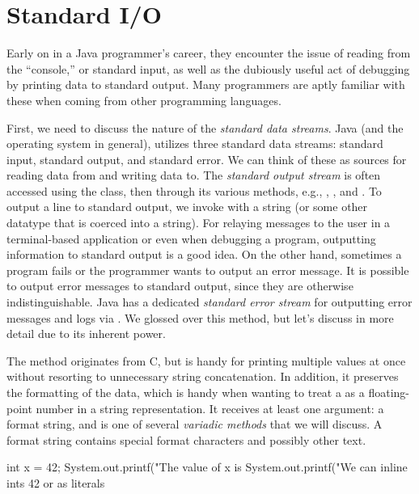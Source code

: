 \section{Standard I/O}
Early on in a Java programmer's career, they encounter the issue of reading from the ``console,'' or standard input, as well as the dubiously useful act of debugging by printing data to standard output. Many programmers are aptly familiar with these when coming from other programming languages.

First, we need to discuss the nature of the \textit{standard data streams}. Java (and the operating system in general), utilizes three standard data streams: standard input, standard output, and standard error. We can think of these as sources for reading data from and writing data to. The \textit{standard output stream} is often accessed using the  class, then through its various methods, e.g., , , and . To output a line to standard output, we invoke  with a string (or some other datatype that is coerced into a string). For relaying messages to the user in a terminal-based application or even when debugging a program, outputting information to standard output is a good idea. On the other hand, sometimes a program fails or the programmer wants to output an error message. It is possible to output error messages to standard output, since they are otherwise indistinguishable. Java has a dedicated \textit{standard error stream} for outputting error messages and logs via . We glossed over this method, but let's discuss  in more detail due to its inherent power.

The  method originates from C, but is handy for printing multiple values at once without resorting to unnecessary string concatenation. In addition, it preserves the formatting of the data, which is handy when wanting to treat a  as a floating-point number in a string representation. It receives at least one argument: a format string, and is one of several \textit{variadic methods} that we will discuss. A format string contains special format characters and possibly other text. 

\begin{verbnobox}[\small]
int x = 42;
System.out.printf("The value of x is %
System.out.printf("We can inline ints 42 or as literals %
\end{verbnobox}

